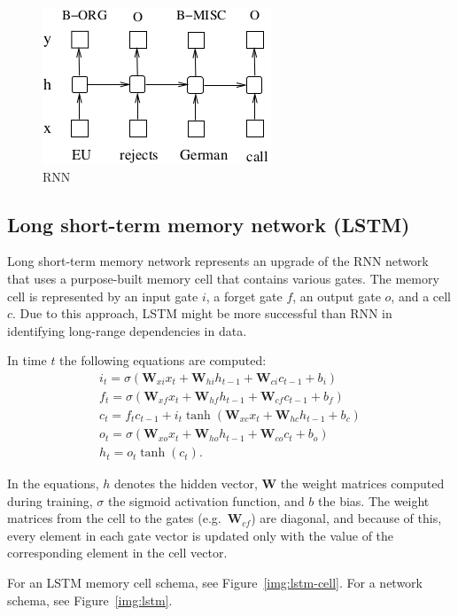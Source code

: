 \begin{figure}[htbp]
    \centering
    \includegraphics{text/images/rnn.png}
    \caption{RNN~\cite{BiLSTMCRF}}\label{img:rnn}
\end{figure}

\subsection{Long short-term memory network (LSTM)}
Long short-term memory network represents an upgrade of the RNN network that uses a purpose-built memory cell that contains various gates. The memory cell is represented by an input gate $i$, a forget gate $f$, an output gate $o$, and a cell $c$. Due to this approach, LSTM might be more successful than RNN in identifying long-range dependencies in data.

In time $t$ the following equations are computed:
\begin{gather}
    i_t = \sigma(\mathbf{W}_{xi}x_t + \mathbf{W}_{hi}h_{t-1} + \mathbf{W}_{ci}c_{t-1} + b_i)\\
    f_t = \sigma(\mathbf{W}_{xf}x_t + \mathbf{W}_{hf}h_{t-1} + \mathbf{W}_{cf}c_{t-1} + b_f)\\
    c_t = f_tc_{t-1} + i_t\tanh(\mathbf{W}_{xc}x_t + \mathbf{W}_{hc}h_{t-1} + b_c)\\
    o_t = \sigma(\mathbf{W}_{xo}x_t + \mathbf{W}_{ho}h_{t-1} + \mathbf{W}_{co}c_t + b_o)\\
    h_t = o_t\tanh(c_t).
\end{gather}

In the equations, $h$ denotes the hidden vector, $\mathbf{W}$ the weight matrices computed during training, $\sigma$ the sigmoid activation function, and $b$ the bias. The weight matrices from the cell to the gates (e.g.~$\mathbf{W}_{cf}$) are diagonal, and because of this, every element in each gate vector is updated only with the value of the corresponding element in the cell vector.~\cite{BiLSTMCRF}

For an LSTM memory cell schema, see Figure~\ref{img:lstm-cell}. For a network schema, see Figure~\ref{img:lstm}.

